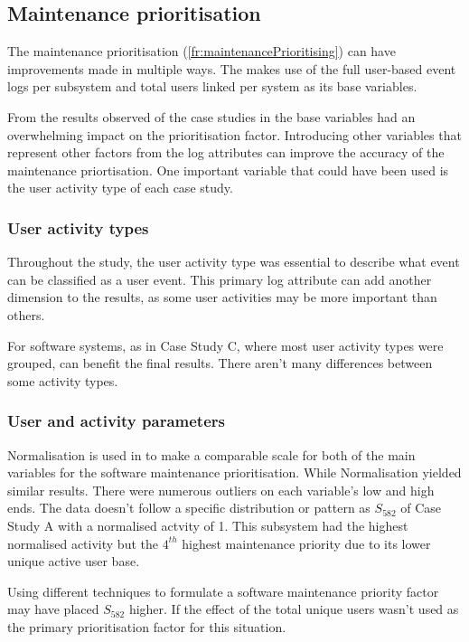 \subsection{Maintenance prioritisation}
The maintenance prioritisation (\ref{fr:maintenancePrioritising}) can have improvements made in multiple ways. The  makes use of the full user-based event logs per subsystem and total users linked per system as its base variables.\par From the results observed of the case studies in  the base variables had an overwhelming impact on the prioritisation factor. Introducing other variables that represent other factors from the log attributes can improve the accuracy of the maintenance priortisation. One important variable that could have been used is the user activity type of each case study.

\subsubsection{User activity types}
Throughout the study, the user activity type was essential to describe what event can be classified as a user event. This primary log attribute can add another dimension to the results, as some user activities may be more important than others. \par For software systems, as in Case Study C, where most user activity types were grouped, can benefit the final results. There aren't many differences between some activity types. 

\subsubsection{User and activity parameters}
\par Normalisation is used in  to make a comparable scale for both of the main variables for the software maintenance prioritisation. While Normalisation yielded similar results. There were numerous outliers on each variable's low and high ends. The data doesn't follow a specific distribution or pattern as $S_{582}$ of Case Study A with a normalised actvity of 1. This subsystem had the highest normalised activity but the $4^{th}$ highest maintenance priority due to its lower unique active user base.\par Using different techniques to formulate a software maintenance priority factor may have placed $S_{582}$ higher. If the effect of the total unique users wasn't used as the primary prioritisation factor for this situation. 

